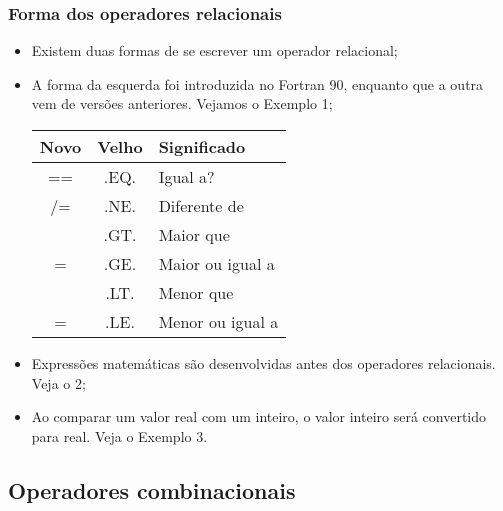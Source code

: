\documentclass[xcolor=table]{beamer}
\newenvironment{stepitemize}{\begin{itemize}[<+->]}{\end{itemize} }
\begin{document}
\begin{frame}%

\frametitle{Forma dos operadores relacionais}

\begin{stepitemize}
\item Existem duas formas de se escrever um operador relacional;

\item A forma da esquerda foi introduzida no Fortran 90, enquanto que a
outra vem de vers\~{o}es anteriores. Vejamos o Exemplo 1;

\begin{center}
	\begin{tabular}{ccl}
		\rowcolor{Maroon}
		Novo & Velho & Significado \\ 
		\hline
		\rowcolor{Maroon!50}
		== & .EQ. & Igual a? \\ 
		\rowcolor{Maroon!20}
		/= & .NE. & Diferente de \\ 
		\rowcolor{Maroon!50}
		\TEXTsymbol{>} & .GT. & Maior que \\ 
		\rowcolor{Maroon!20}
		\TEXTsymbol{>}= & .GE. & Maior ou igual a \\ 
		\rowcolor{Maroon!50}
		\TEXTsymbol{<} & .LT. & Menor que \\ 
		\rowcolor{Maroon!20}
		\TEXTsymbol{<}= & .LE. & Menor ou igual a%
	\end{tabular}
\end{center}

\item Express\~{o}es matem\'{a}ticas s\~{a}o desenvolvidas antes dos
operadores relacionais. Veja o 2;

\item Ao comparar um valor real com um inteiro, o valor inteiro ser\'{a}
convertido para real. Veja o Exemplo 3.
\end{stepitemize}

\transboxout%
\end{frame}%

\subsection{Operadores combinacionais}
\end{document}
